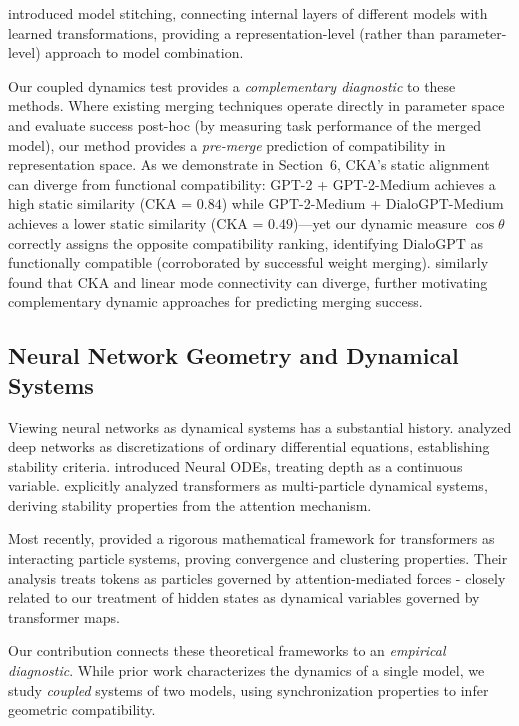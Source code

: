 \documentclass[10pt]{article} %
\theoremstyle{plain}
\theoremstyle{definition}
\theoremstyle{remark}
\begin{document}
\citet{bansal2021stitching} introduced model stitching, connecting internal layers of different models with learned transformations, providing a representation-level (rather than parameter-level) approach to model combination.

Our coupled dynamics test provides a \textit{complementary diagnostic} to these methods. Where existing merging techniques operate directly in parameter space and evaluate success post-hoc (by measuring task performance of the merged model), our method provides a \textit{pre-merge} prediction of compatibility in representation space. As we demonstrate in Section~6, CKA's static alignment can diverge from functional compatibility: GPT-2 + GPT-2-Medium achieves a high static similarity (CKA = $0.84$) while GPT-2-Medium + DialoGPT-Medium achieves a lower static similarity (CKA = $0.49$)---yet our dynamic measure $\cos \theta$ correctly assigns the opposite compatibility ranking, identifying DialoGPT as functionally compatible (corroborated by successful weight merging). \citet{zhou2024crosslmc} similarly found that CKA and linear mode connectivity can diverge, further motivating complementary dynamic approaches for predicting merging success.

\subsection{Neural Network Geometry and Dynamical Systems}

Viewing neural networks as dynamical systems has a substantial history. \citet{haber2017stable} analyzed deep networks as discretizations of ordinary differential equations, establishing stability criteria. \citet{chen2018neuralode} introduced Neural ODEs, treating depth as a continuous variable. \citet{lu2020understanding} explicitly analyzed transformers as multi-particle dynamical systems, deriving stability properties from the attention mechanism.

Most recently, \citet{geshkovski2024mathematical} provided a rigorous mathematical framework for transformers as interacting particle systems, proving convergence and clustering properties. Their analysis treats tokens as particles governed by attention-mediated forces - closely related to our treatment of hidden states as dynamical variables governed by transformer maps.

Our contribution connects these theoretical frameworks to an \textit{empirical diagnostic}. While prior work characterizes the dynamics of a single model, we study \textit{coupled} systems of two models, using synchronization properties to infer geometric compatibility.
\end{document}

